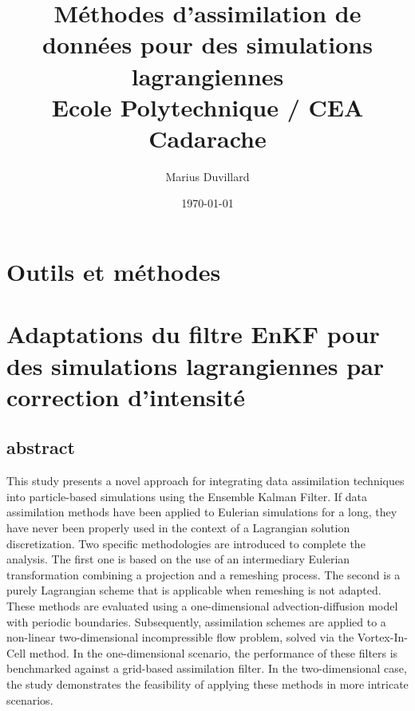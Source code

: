 \documentclass[a4paper]{report}
\title{
{Méthodes d'assimilation de données pour des simulations lagrangiennes}\\
{\large Ecole Polytechnique / CEA Cadarache}
}
\author{Marius Duvillard}
\date{\today}
\begin{document}
\maketitle
\tableofcontents





\chapter{Outils et méthodes}





\chapter{Adaptations du filtre EnKF pour des simulations lagrangiennes par correction d'intensité}

\section{abstract}
This study presents a novel approach for integrating data assimilation techniques into particle-based simulations using the Ensemble Kalman Filter. If data assimilation methods have been applied to Eulerian simulations for a long, they have never been properly used in the context of a Lagrangian solution discretization. Two specific methodologies are introduced to complete the analysis. The first one is based on the use of an intermediary Eulerian transformation combining a projection and a remeshing process. The second is a purely Lagrangian scheme that is applicable when remeshing is not adapted. These methods are evaluated using a one-dimensional advection-diffusion model with periodic boundaries. Subsequently, assimilation schemes are applied to a non-linear two-dimensional incompressible flow problem, solved via the Vortex-In-Cell method. In the one-dimensional scenario, the performance of these filters is benchmarked against a grid-based assimilation filter. In the two-dimensional case, the study demonstrates the feasibility of applying these methods in more intricate scenarios.








\begin{subappendices}
    
\end{subappendices}

% 
% 



% 
\printbibliography[heading=bibintoc]
% 
\end{document}
